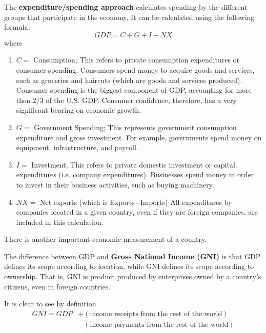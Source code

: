 \documentclass{article}
\begin{document}
    \begin{definition}
    The \textbf{expenditure/spending approach} calculates spending by the different groups that participate in the economy. It can be calculated using the following formula: 
    \[GDP = C + G + I + NX\]
    where
    \begin{enumerate}
        \item $C = $ Consumption; This refers to private consumption expenditures or consumer spending. Consumers spend money to acquire goods and services, such as groceries and haircuts (which are goods and services produced). Consumer spending is the biggest component of GDP, accounting for more then $2/3$ of the U.S. GDP. Consumer confidence, therefore, has a very significant bearing on economic growth. 
        \item $G = $ Government Spending; This represents government consumption expenditure and gross investment. For example, governments spend money on equipment, infrastructure, and payroll. 
        \item $I = $ Investment; This refers to private domestic investment or capital expenditures (i.e. company expenditures). Businesses spend money in order to invest in their business activities, such as buying machinery. 
        \item $NX = $ Net exports (which is Exports$-$Imports) All expenditures by companies located in a given country, even if they are foreign companies, are included in this calculation. 
    \end{enumerate}
    \end{definition}

    There is another important economic measurement of a country. 

    \begin{definition}
    The difference between GDP and \textbf{Gross National Income (GNI)} is that GDP defines its scope according to location, while GNI defines its scope according to ownership. That is, GNI is product produced by enterprises owned by a country's citizens, even in foreign countries.

    It is clear to see by definition 
    \begin{align*}
        GNI = GDP & + (\text{income receipts from the rest of the world}) \\
        & - (\text{income payments from the rest of the world})
    \end{align*}
    \end{definition}
\end{document}
